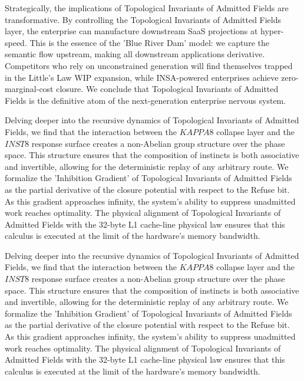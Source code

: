 \documentclass[12pt,a4paper,oneside]{book}
\begin{document}
Strategically, the implications of Topological Invariants of Admitted Fields are transformative. By controlling the Topological Invariants of Admitted Fields layer, the enterprise can manufacture downstream SaaS projections at hyper-speed. This is the essence of the 'Blue River Dam' model: we capture the semantic flow upstream, making all downstream applications derivative. Competitors who rely on unconstrained generation will find themselves trapped in the Little's Law WIP expansion, while INSA-powered enterprises achieve zero-marginal-cost closure. We conclude that Topological Invariants of Admitted Fields is the definitive atom of the next-generation enterprise nervous system. 

Delving deeper into the recursive dynamics of Topological Invariants of Admitted Fields, we find that the interaction between the $KAPPA8$ collapse layer and the $INST8$ response surface creates a non-Abelian group structure over the phase space. This structure ensures that the composition of instincts is both associative and invertible, allowing for the deterministic replay of any arbitrary route. We formalize the 'Inhibition Gradient' of Topological Invariants of Admitted Fields as the partial derivative of the closure potential with respect to the Refuse bit. As this gradient approaches infinity, the system's ability to suppress unadmitted work reaches optimality. The physical alignment of Topological Invariants of Admitted Fields with the 32-byte L1 cache-line physical law ensures that this calculus is executed at the limit of the hardware's memory bandwidth. 

Delving deeper into the recursive dynamics of Topological Invariants of Admitted Fields, we find that the interaction between the $KAPPA8$ collapse layer and the $INST8$ response surface creates a non-Abelian group structure over the phase space. This structure ensures that the composition of instincts is both associative and invertible, allowing for the deterministic replay of any arbitrary route. We formalize the 'Inhibition Gradient' of Topological Invariants of Admitted Fields as the partial derivative of the closure potential with respect to the Refuse bit. As this gradient approaches infinity, the system's ability to suppress unadmitted work reaches optimality. The physical alignment of Topological Invariants of Admitted Fields with the 32-byte L1 cache-line physical law ensures that this calculus is executed at the limit of the hardware's memory bandwidth. 
\end{document}
